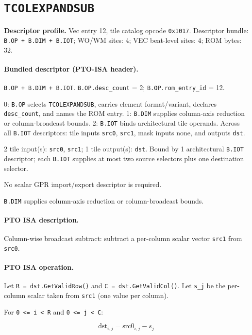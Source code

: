 \section{\texttt{TCOLEXPANDSUB}}
\noindent\textbf{Descriptor profile.} Vec entry 12, tile catalog opcode \texttt{0x1017}. Descriptor bundle: \texttt{B.OP + B.DIM + B.IOT}; WO/WM sites: 4; VEC beat-level sites: 4; ROM bytes: 32.\par\smallskip
{}
\paragraph{Bundled descriptor (PTO-ISA header).}
\begin{description}[leftmargin=0.18\linewidth,style=nextline]
\item[Bundle] \texttt{B.OP + B.DIM + B.IOT}. \texttt{B.OP.desc\_count} = 2; \texttt{B.OP.rom\_entry\_id} = 12.
\item[Assembly] 0: \texttt{B.OP} selects \texttt{TCOLEXPANDSUB}, carries element format/variant, declares \texttt{desc\_count}, and names the ROM entry. 1: \texttt{B.DIM} supplies column-axis reduction or column-broadcast bounds. 2: \texttt{B.IOT} binds architectural tile operands. Across all \texttt{B.IOT} descriptors: tile inputs \texttt{src0}, \texttt{src1}, mask inputs none, and outputs \texttt{dst}.
\item[Tile operands] 2 tile input(s): \texttt{src0}, \texttt{src1}; 1 tile output(s): \texttt{dst}. Bound by 1 architectural \texttt{B.IOT} descriptor; each \texttt{B.IOT} supplies at most two source selectors plus one destination selector.
\item[Scalar GPR operands] No scalar GPR import/export descriptor is required.
\item[Metadata operands] \texttt{B.DIM} supplies column-axis reduction or column-broadcast bounds.
\end{description}
\par\smallskip
{\small
\paragraph{PTO ISA description.}
Column-wise broadcast subtract: subtract a per-column scalar vector \texttt{src1} from \texttt{src0}.
\paragraph{PTO ISA operation.}
Let \texttt{R = dst.GetValidRow()} and \texttt{C = dst.GetValidCol()}. Let \texttt{s\_j} be the per-column scalar taken from \texttt{src1} (one value per column).

For \texttt{0 \textless{}= i \textless{} R} and \texttt{0 \textless{}= j \textless{} C}:

\[
\mathrm{dst}_{i,j} = \mathrm{src0}_{i,j} - s_j
\]
}\par\smallskip
